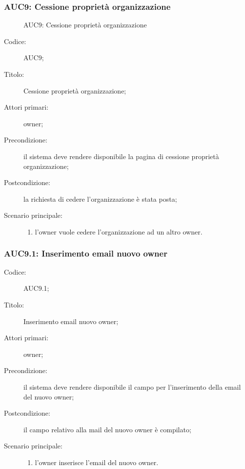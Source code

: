 \documentclass[../../../analisi-dei-requisiti.tex]{subfiles}
\begin{document}
\subsubsection{AUC9: Cessione proprietà organizzazione}%
\label{subs:AUC9}

\begin{figure}[H]
  \centering
  \caption{AUC9: Cessione proprietà organizzazione}%
  \label{fig:auc9}
\end{figure}

\begin{description}
  \item[Codice:] AUC9;
  \item[Titolo:] Cessione proprietà organizzazione;
  \item[Attori primari:] owner;
  \item[Precondizione:] il sistema deve rendere disponibile la pagina di cessione proprietà organizzazione;
  \item[Postcondizione:] la richiesta di cedere l'organizzazione è stata posta;
  \item[Scenario principale:]
  \begin{enumerate}
    \item l'owner vuole cedere l'organizzazione ad un altro owner.
  \end{enumerate}
\end{description}

\subsubsection{AUC9.1: Inserimento email nuovo owner}%
\label{subs:AUC9.1}
\begin{description}
  \item[Codice:] AUC9.1;
  \item[Titolo:] Inserimento email nuovo owner;
  \item[Attori primari:] owner;
  \item[Precondizione:] il sistema deve rendere disponibile il campo per l'inserimento della email del nuovo owner;
  \item[Postcondizione:] il campo relativo alla mail del nuovo owner è compilato;
  \item[Scenario principale:]
  \begin{enumerate}
    \item l'owner inserisce l'email del nuovo owner.
  \end{enumerate}
\end{description}
\end{document}
